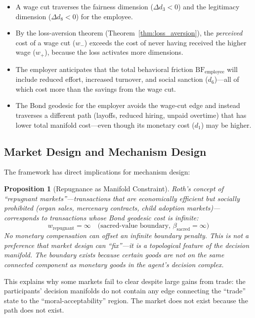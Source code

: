 \documentclass[12pt]{article}
\newtheorem{proposition}[theorem]{Proposition}
\theoremstyle{definition}
\theoremstyle{remark}
\newcommand{\BF}{\mathrm{BF}}              %
\begin{document}
\begin{itemize}
    \item A wage cut traverses the fairness dimension ($\Delta d_3 < 0$) and the legitimacy dimension ($\Delta d_8 < 0$) for the employee.
    \item By the loss-aversion theorem (Theorem~\ref{thm:loss_aversion}), the \emph{perceived} cost of a wage cut ($w_-$) exceeds the cost of never having received the higher wage ($w_+$), because the loss activates more dimensions.
    \item The employer anticipates that the total behavioral friction $\BF_{\text{employee}}$ will include reduced effort, increased turnover, and social sanction ($d_6$)---all of which cost more than the savings from the wage cut.
    \item The Bond geodesic for the employer avoids the wage-cut edge and instead traverses a different path (layoffs, reduced hiring, unpaid overtime) that has lower total manifold cost---even though its monetary cost ($d_1$) may be higher.
\end{itemize}

\subsection{Market Design and Mechanism Design}

The framework has direct implications for mechanism design:

\begin{proposition}[Repugnance as Manifold Constraint]
\label{prop:repugnance}
Roth's \cite{roth2007} concept of ``repugnant markets''---transactions that are economically efficient but socially prohibited (organ sales, mercenary contracts, child adoption markets)---corresponds to transactions whose Bond geodesic cost is infinite:
\begin{equation}
w_{\text{repugnant}} = \infty \quad \text{(sacred-value boundary, } \beta_{\text{sacred}} = \infty\text{)}
\end{equation}
No monetary compensation can offset an infinite boundary penalty.  This is not a preference that market design can ``fix''---it is a topological feature of the decision manifold.  The boundary exists because certain goods are \emph{not on the same connected component} as monetary goods in the agent's decision complex.
\end{proposition}

This explains why some markets fail to clear despite large gains from trade: the participants' decision manifolds do not contain any edge connecting the ``trade'' state to the ``moral-acceptability'' region.  The market does not exist because the path does not exist.
\end{document}
